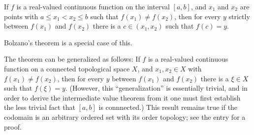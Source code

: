 \documentclass{article}
\begin{document}

If $f$ is a real-valued continuous function on the interval $[a,b]$,
and $x_1$ and $x_2$ are points with $a\le x_1<x_2\le b$
such that $f(x_1)\ne f(x_2)$,
then for every $y$ strictly between $f(x_1)$ and $f(x_2)$
there is a $c\in(x_1,x_2)$ such that $f(c)=y$.

Bolzano's theorem is a special case of this.

The theorem can be generalized as follows:
If $f$ is a real-valued continuous function
on a connected topological space $X$,
and $x_1, x_2 \in X$ with $f(x_1) \ne f(x_2)$,
then for every $y$ between $f(x_1)$ and $f(x_2)$
there is a $\xi \in X$ such that $f(\xi) = y$.
(However, this ``generalization'' is essentially trivial,
and in order to derive the intermediate value theorem from it
one must first establish the less trivial fact that $[a,b]$ is connnected.)
This result remains true
if the codomain is an arbitrary ordered set with its order topology;
see the entry
for a proof.
\end{document}
